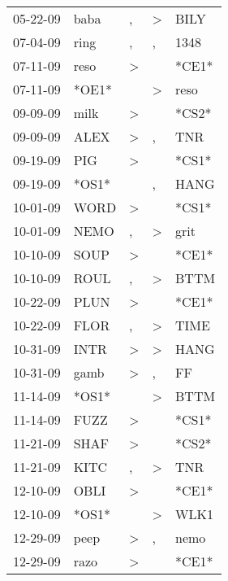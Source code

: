 \begin{supertabular}{lllll}
 05-22-09 &   baba &                , &     \textgreater &   BILY \\
 07-04-09 &   ring &                , &                , &   1348 \\
 07-11-09 &   reso &     \textgreater &                  &  *CE1* \\
 07-11-09 &  *OE1* &                  &     \textgreater &   reso \\
 09-09-09 &   milk &     \textgreater &                  &  *CS2* \\
 09-09-09 &   ALEX &     \textgreater &                , &    TNR \\
 09-19-09 &    PIG &     \textgreater &                  &  *CS1* \\
 09-19-09 &  *OS1* &                  &                , &   HANG \\
 10-01-09 &   WORD &     \textgreater &                  &  *CS1* \\
 10-01-09 &   NEMO &                , &     \textgreater &   grit \\
 10-10-09 &   SOUP &     \textgreater &                  &  *CE1* \\
 10-10-09 &   ROUL &                , &     \textgreater &   BTTM \\
 10-22-09 &   PLUN &     \textgreater &                  &  *CE1* \\
 10-22-09 &   FLOR &                , &     \textgreater &   TIME \\
 10-31-09 &   INTR &     \textgreater &     \textgreater &   HANG \\
 10-31-09 &   gamb &     \textgreater &                , &     FF \\
 11-14-09 &  *OS1* &                  &     \textgreater &   BTTM \\
 11-14-09 &   FUZZ &     \textgreater &                  &  *CS1* \\
 11-21-09 &   SHAF &     \textgreater &                  &  *CS2* \\
 11-21-09 &   KITC &                , &     \textgreater &    TNR \\
 12-10-09 &   OBLI &     \textgreater &                  &  *CE1* \\
 12-10-09 &  *OS1* &                  &     \textgreater &   WLK1 \\
 12-29-09 &   peep &     \textgreater &                , &   nemo \\
 12-29-09 &   razo &     \textgreater &                  &  *CE1* \\

\end{supertabular}
